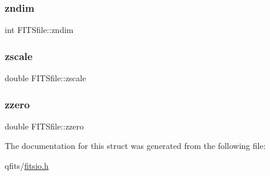 \mbox{\label{struct_f_i_t_sfile_a5ff648277ce3a2220a533ea37c2b785f}} 
\subsubsection{\texorpdfstring{zndim}{zndim}}
{\footnotesize\ttfamily int F\+I\+T\+Sfile\+::zndim}

\mbox{\label{struct_f_i_t_sfile_a75b683d8db4f2acc96ed39e4249ca264}} 
\subsubsection{\texorpdfstring{zscale}{zscale}}
{\footnotesize\ttfamily double F\+I\+T\+Sfile\+::zscale}

\mbox{\label{struct_f_i_t_sfile_a02930842674ceaf944372231964cd506}} 
\subsubsection{\texorpdfstring{zzero}{zzero}}
{\footnotesize\ttfamily double F\+I\+T\+Sfile\+::zzero}



The documentation for this struct was generated from the following file\+:\begin{DoxyCompactItemize}
\item 
qfits/\hyperlink{fitsio_8h}{fitsio.\+h}\end{DoxyCompactItemize}
